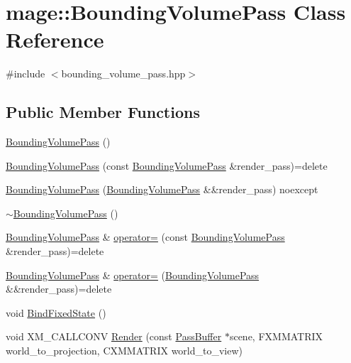 \hypertarget{classmage_1_1_bounding_volume_pass}{}\section{mage\+:\+:Bounding\+Volume\+Pass Class Reference}
\label{classmage_1_1_bounding_volume_pass}


{\ttfamily \#include $<$bounding\+\_\+volume\+\_\+pass.\+hpp$>$}

\subsection*{Public Member Functions}
\begin{DoxyCompactItemize}
\item 
\hyperlink{classmage_1_1_bounding_volume_pass_ab32eb9086e463f5260f8999b78b55b26}{Bounding\+Volume\+Pass} ()
\item 
\hyperlink{classmage_1_1_bounding_volume_pass_a21408cc53051c9c6d94efe41b3bea404}{Bounding\+Volume\+Pass} (const \hyperlink{classmage_1_1_bounding_volume_pass}{Bounding\+Volume\+Pass} \&render\+\_\+pass)=delete
\item 
\hyperlink{classmage_1_1_bounding_volume_pass_a569c5b210bb1135771970ef7ac70c210}{Bounding\+Volume\+Pass} (\hyperlink{classmage_1_1_bounding_volume_pass}{Bounding\+Volume\+Pass} \&\&render\+\_\+pass) noexcept
\item 
\hyperlink{classmage_1_1_bounding_volume_pass_a41dc433aed26f05e8b60462a6e337509}{$\sim$\+Bounding\+Volume\+Pass} ()
\item 
\hyperlink{classmage_1_1_bounding_volume_pass}{Bounding\+Volume\+Pass} \& \hyperlink{classmage_1_1_bounding_volume_pass_a2115e9af06e0bc7e42fc95e10f0dacad}{operator=} (const \hyperlink{classmage_1_1_bounding_volume_pass}{Bounding\+Volume\+Pass} \&render\+\_\+pass)=delete
\item 
\hyperlink{classmage_1_1_bounding_volume_pass}{Bounding\+Volume\+Pass} \& \hyperlink{classmage_1_1_bounding_volume_pass_a3887d5ffbb5e175187004f0b057ddcaa}{operator=} (\hyperlink{classmage_1_1_bounding_volume_pass}{Bounding\+Volume\+Pass} \&\&render\+\_\+pass)=delete
\item 
void \hyperlink{classmage_1_1_bounding_volume_pass_a67c802211155c0eae3e15343244ba2c4}{Bind\+Fixed\+State} ()
\item 
void X\+M\+\_\+\+C\+A\+L\+L\+C\+O\+NV \hyperlink{classmage_1_1_bounding_volume_pass_ae352f2fd1c7db9309ba873ad84d9933f}{Render} (const \hyperlink{structmage_1_1_pass_buffer}{Pass\+Buffer} $\ast$scene, F\+X\+M\+M\+A\+T\+R\+IX world\+\_\+to\+\_\+projection, C\+X\+M\+M\+A\+T\+R\+IX world\+\_\+to\+\_\+view)
\end{DoxyCompactItemize}
